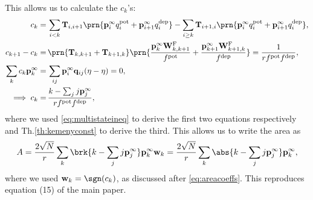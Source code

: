 \documentclass{article} %
\newcommand{\pr}{\mathbf{p}}
\newcommand{\eq}{\pr^\infty}
\newcommand{\fpt}{\mathbf{T}}
\newcommand{\w}{\mathbf{w}}
\newcommand{\W}{\mathbf{W}}
\newcommand{\enc}{\mathbf{q}}
\newcommand{\frg}{\W^{\mathrm{F}}}
\newcommand{\pot}{^{\text{pot}}}
\newcommand{\dep}{^{\text{dep}}}
\begin{document}
This allows us to calculate the $c_k$'s:
%
\begin{equation}\label{eq:areacoeffchain}
\begin{aligned}
  c_k =&\, \sum_{i<k} \fpt_{i,i+1} \prn{\eq_{i}q\pot _i+\eq_{i+1}q\dep _i}
    - \sum_{i\geq k} \fpt_{i+1,i} \prn{\eq_{i}q\pot _i+\eq_{i+1}q\dep _i}
  ,\\
  c_{k+1} - c_k =&\, \prn{\fpt_{k,k+1}+\fpt_{k+1,k}} \prn{\frac{\eq_{k}\frg_{k,k+1}}{f\pot }+\frac{\eq_{k+1}\frg_{k+1,k}}{f\dep }}
    =%
    \frac{1}{rf\pot f\dep },\\
  \sum_k c_k \eq_k =&\, \sum_{ij} \eq_i \enc_{ij} (\eta-\eta) = 0,\\
  \implies c_k =&\, \frac{k - \sum_j j\eq_j}{rf\pot f\dep },
\end{aligned}
\end{equation}
%
where we used \eqref{eq:multistateineq} to derive the first two equations respectively and Th.\ref{th:kemenyconst} to derive the third. This allows us to write the area as
%
\begin{equation}\label{eq:multistatearea}
  A = \frac{2\sqrt{N}}{r} \sum_k \brk{k - \sum_j j\eq_j} \eq_k \w_k
    = \frac{2\sqrt{N}}{r} \sum_k \abs{k - \sum_j j\eq_j} \eq_k ,
\end{equation}
%
where we used $\w_k=\sgn(c_k)$, as discussed after \eqref{eq:areacoeffs}.
This reproduces equation (15) of the main paper.
\end{document}
